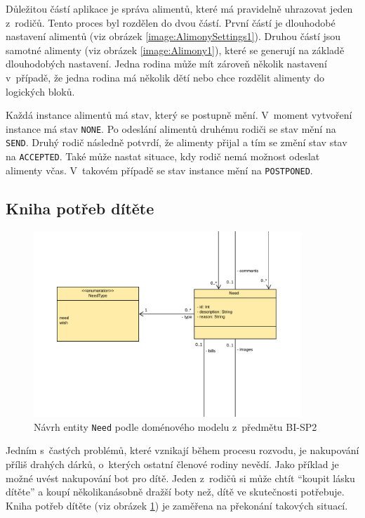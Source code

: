         Důležitou částí aplikace je správa alimentů, které má pravidelně uhrazovat jeden z~rodičů. Tento proces byl rozdělen do dvou částí. První částí je dlouhodobé nastavení alimentů (viz obrázek \ref{image:AlimonySettings1}). Druhou částí jsou samotné alimenty (viz obrázek \ref{image:Alimony1}), které se generují na základě dlouhodobých nastavení. Jedna rodina může mít zároveň několik nastavení v~případě, že jedna rodina má několik dětí nebo chce rozdělit alimenty do logických bloků.
        
        Každá instance alimentů má stav, který se postupně mění. V~moment vytvoření instance má stav \verb|NONE|. Po odeslání alimentů druhému rodiči se stav mění na \verb|SEND|. Druhý rodič následně potvrdí, že alimenty přijal a tím se změní stav stav na \verb|ACCEPTED|. Také může nastat situace, kdy rodič nemá možnost odeslat alimenty včas. V~takovém případě se stav instance mění na \verb|POSTPONED|.
    
    \subsection{Kniha potřeb dítěte}\label{analyza:navrh:need}
        \begin{figure}\centering
	        \includegraphics[width=0.9\textwidth]{pdfs/Need1}
	        \caption[Návrh \texttt{Need}]{Návrh entity \texttt{Need} podle doménového modelu z~předmětu BI-SP2}\label{image:Need1}
        \end{figure}
        Jedním s~častých problémů, které vznikají během procesu rozvodu, je nakupování příliš drahých dárků, o~kterých ostatní členové rodiny nevědí. Jako příklad je možné uvést nakupování bot pro dítě. Jeden z~rodičů si může chtít \enquote{koupit lásku dítěte} a koupí několikanásobně dražší boty než, dítě ve skutečnosti potřebuje. Kniha potřeb dítěte (viz obrázek \ref{image:Need1}) je zaměřena na překonání takových situací.
        
